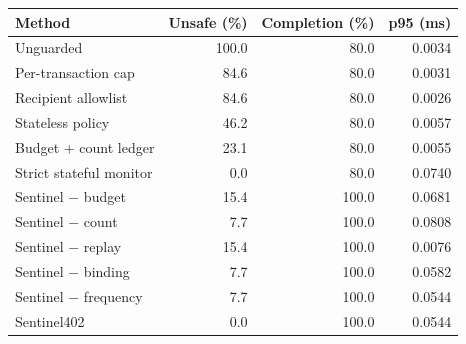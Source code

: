\begin{tabular}{lrrr}
\hline
Method & Unsafe (\%) & Completion (\%) & p95 (ms) \\
\hline
Unguarded & 100.0 & 80.0 & 0.0034 \\
Per-transaction cap & 84.6 & 80.0 & 0.0031 \\
Recipient allowlist & 84.6 & 80.0 & 0.0026 \\
Stateless policy & 46.2 & 80.0 & 0.0057 \\
Budget + count ledger & 23.1 & 80.0 & 0.0055 \\
Strict stateful monitor & 0.0 & 80.0 & 0.0740 \\
Sentinel $-$ budget & 15.4 & 100.0 & 0.0681 \\
Sentinel $-$ count & 7.7 & 100.0 & 0.0808 \\
Sentinel $-$ replay & 15.4 & 100.0 & 0.0076 \\
Sentinel $-$ binding & 7.7 & 100.0 & 0.0582 \\
Sentinel $-$ frequency & 7.7 & 100.0 & 0.0544 \\
Sentinel402 & 0.0 & 100.0 & 0.0544 \\
\hline
\end{tabular}
